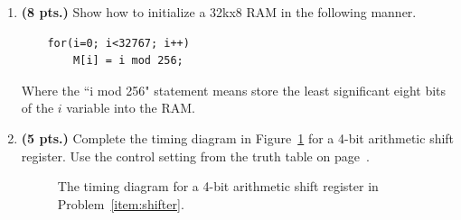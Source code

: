 \begin{enumerate}
\item{\bf (8 pts.)} Show how to initialize a 32kx8 RAM in the following manner. 
\begin{verbatim}
    for(i=0; i<32767; i++) 
        M[i] = i mod 256;
\end{verbatim}

Where the ``i mod 256" statement means store the least significant 
eight bits of the $i$ variable into the RAM. 

\begin{solution} {
\begin{figure}[ht]
\end{figure}
}\end{solution}

\item{\bf (5 pts.)} Complete the timing diagram in Figure~\ref{fig:hwshift}
\label{item:shifter}
for a 4-bit arithmetic shift register.  Use the control setting from the
truth table on page~\pageref{page:shi}.
\begin{figure}[ht]
\caption{The timing diagram for a 4-bit arithmetic shift register in 
Problem~\ref{item:shifter}.}
\label{fig:hwshift}
\end{figure}


\end{enumerate}
